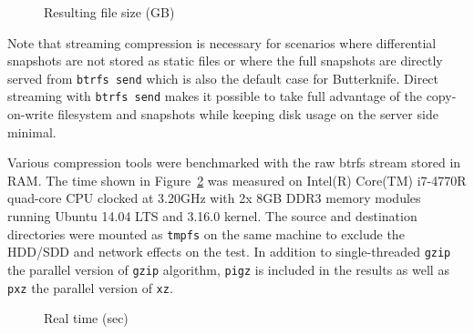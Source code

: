 \documentclass[a4paper,11pt]{kth-mag}
\begin{document}
\begin{figure}
\caption{Resulting file size (GB)}
\label{chart:resulting-file-size}
\end{figure}

Note that streaming compression is necessary for scenarios
where differential snapshots are not stored as static files
or where the full snapshots are directly served from
\lstinline!btrfs send! which is also the default case for Butterknife.
Direct streaming with \lstinline!btrfs send! makes it possible
to take full advantage of the copy-on-write filesystem
and snapshots while keeping disk usage on the server side minimal.

Various compression tools were benchmarked with
the raw \acrshort{btrfs} stream stored in RAM.
The time shown in Figure~\ref{fig:compression-benchmark-real-time}
was measured on Intel(R) Core(TM) i7-4770R quad-core CPU
clocked at 3.20GHz with 2x 8GB DDR3 memory modules running
Ubuntu 14.04 LTS and 3.16.0 kernel.
The source and destination directories were
mounted as \lstinline!tmpfs! on the same
machine to exclude the
HDD/SDD and network effects on the test.
In addition to single-threaded \lstinline!gzip!
the parallel version of \lstinline!gzip! algorithm,
\lstinline!pigz! is included in the results as well as \lstinline!pxz!
the parallel version of \lstinline!xz!.
\\

\begin{figure}
\caption{Real time (sec)}
\label{fig:compression-benchmark-real-time}
\end{figure}
\end{document}
